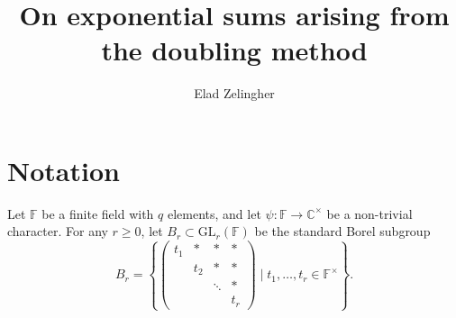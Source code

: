 \documentclass[12pt, reqno]{amsart}
\title{On exponential sums arising from the doubling method}
\author{Elad Zelingher}
\theoremstyle{definition}
\theoremstyle{definition}
\theoremstyle{definition}
\newcommand{\cComplex}{\mathbb{C}}
\newcommand{\multiplicativegroup}[1]{#1^{\times}}
\newcommand{\fieldCharacter}{\psi}
\newcommand{\GL}{\mathrm{GL}}
\newcommand{\finiteField}{\mathbb{F}}
\begin{document}
\begin{abstract}
\end{abstract}
\maketitle

\section{Notation}
Let $\finiteField$ be a finite field with $q$ elements, and let $\fieldCharacter \colon \finiteField \to \multiplicativegroup{\cComplex}$ be a non-trivial character. For any $r \ge 0$, let $B_r \subset \GL_r\left(\finiteField\right)$ be the standard Borel subgroup
$$B_r = \left\{ \begin{pmatrix}
	t_1 & \ast & \ast & \ast\\
	& t_2 & \ast & \ast \\
	& & \ddots & \ast\\
	& & & t_r
\end{pmatrix} \mid t_1,\dots,t_r \in \multiplicativegroup{\finiteField} \right\}.$$
\end{document}
